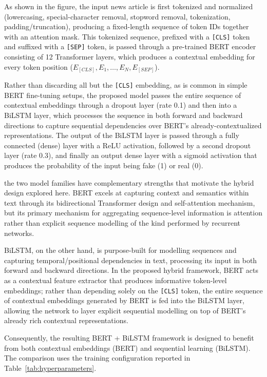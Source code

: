 As shown in the figure, the input news article is first tokenized and normalized (lowercasing, special-character removal, stopword removal, tokenization, padding/truncation), producing a fixed-length sequence of token IDs together with an attention mask. This tokenized sequence, prefixed with a \texttt{[CLS]} token and suffixed with a \texttt{[SEP]} token, is passed through a pre-trained BERT encoder consisting of 12 Transformer layers, which produces a contextual embedding for every token position ($E_{[CLS]}, E_1, \ldots, E_N, E_{[SEP]}$).

Rather than discarding all but the \texttt{[CLS]} embedding, as is common in simple BERT fine-tuning setups, the proposed model passes the entire sequence of contextual embeddings through a dropout layer (rate 0.1) and then into a BiLSTM layer, which processes the sequence in both forward and backward directions to capture sequential dependencies over BERT's already-contextualized representations. The output of the BiLSTM layer is passed through a fully connected (dense) layer with a ReLU activation, followed by a second dropout layer (rate 0.3), and finally an output dense layer with a sigmoid activation that produces the probability of the input being fake (1) or real (0).

the two model families have complementary strengths that motivate the hybrid design explored here. BERT excels at capturing context and semantics within text through its bidirectional Transformer design and self-attention mechanism, but its primary mechanism for aggregating sequence-level information is attention rather than explicit sequence modelling of the kind performed by recurrent networks.

BiLSTM, on the other hand, is purpose-built for modelling sequences and capturing temporal/positional dependencies in text, processing its input in both forward and backward directions. In the proposed hybrid framework, BERT acts as a contextual feature extractor that produces informative token-level embeddings; rather than depending solely on the \texttt{[CLS]} token, the entire sequence of contextual embeddings generated by BERT is fed into the BiLSTM layer, allowing the network to layer explicit sequential modelling on top of BERT's already rich contextual representations.

Consequently, the resulting BERT + BiLSTM framework is designed to benefit from both contextual embeddings (BERT) and sequential learning (BiLSTM). The comparison uses the training configuration reported in Table~\ref{tab:hyperparameters}.

